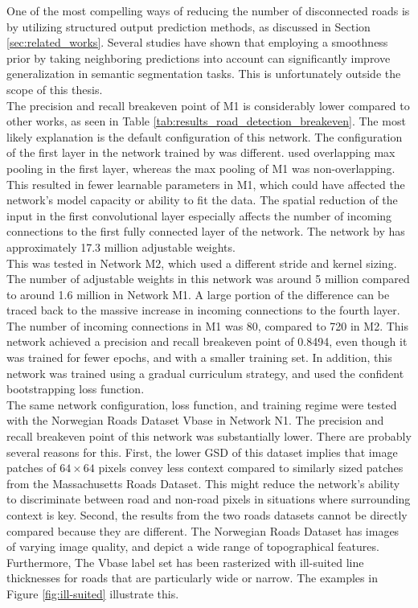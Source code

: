 One of the most compelling ways of reducing the number of disconnected roads is by utilizing structured output prediction methods, as discussed in Section \ref{sec:related_works}. Several studies \citep{Kluckner_semantic_height} \citep{LeCun_semantic} \citep{Mnih_roads_high_res_aerial_images} have shown that employing a smoothness prior by taking neighboring predictions into account can significantly improve generalization in semantic segmentation tasks. This is unfortunately outside the scope of this thesis.\\

The precision and recall breakeven point of M1 is considerably lower compared to other works, as seen in Table \ref{tab:results_road_detection_breakeven}. The most likely explanation is the default configuration of this network. The configuration of the first layer in the network trained by \cite{MnihThesis} was different. \cite{MnihThesis} used overlapping max pooling in the first layer, whereas the max pooling of M1 was non-overlapping. This resulted in fewer learnable parameters in M1, which could have affected the network's model capacity or ability to fit the data. The spatial reduction of the input in the first convolutional layer especially affects the number of incoming connections to the first fully connected layer of the network.  The network by \cite{MnihThesis} has approximately 17.3 million adjustable weights.\\

This was tested in Network M2, which used a different stride and kernel sizing. The number of adjustable weights in this network was around 5 million compared to around 1.6 million in Network M1. A large portion of the difference can be traced back to the massive increase in incoming connections to the fourth layer. The number of incoming connections in M1 was 80, compared to 720 in M2. This network achieved a precision and recall breakeven point of 0.8494, even though it was trained for fewer epochs, and with a smaller training set. In addition, this network was trained using a gradual curriculum strategy, and used the confident bootstrapping loss function. \\

The same network configuration, loss function, and training regime were tested with the Norwegian Roads Dataset Vbase in Network N1. The precision and recall breakeven point of this network was substantially lower. There are probably several reasons for this. First, the lower \ac{GSD} of this dataset implies that image  patches of $64 \times 64$ pixels convey less context compared to similarly sized patches from the Massachusetts Roads Dataset. This might reduce the network's ability to discriminate between road and non-road pixels in situations where surrounding context is key. Second, the results from the two roads datasets cannot be directly compared because they are different. The Norwegian Roads Dataset has images of varying image quality, and depict a wide range of topographical features. Furthermore, The Vbase label set has been rasterized with ill-suited line thicknesses for roads that are particularly wide or narrow. The examples in Figure \ref{fig:ill-suited} illustrate this. 

